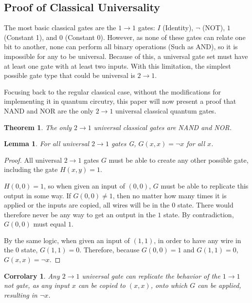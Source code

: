 \documentclass[12pt]{article}
\begin{document}
\subsection{Proof of Classical Universality}
The most basic classical gates are the $1 \to 1$ gates: $I$ (Identity),  $\neg$ (NOT), $1$ (Constant 1), and $0$ (Constant 0). However, as none of these gates can relate one bit to another, none can perform all binary operations (Such as AND), so it is impossible for any to be universal. Because of this, a universal gate set must have at least one gate with at least two inputs.
With this limitation, the simplest possible gate type that could be universal is $2 \to 1$.

Focusing back to the regular classical case, without the modifications for implementing it in quantum circutry, this paper will now present a proof that NAND and NOR are the only $2 \to 1$ universal classical quantum gates.


\newtheorem{theorem}{Theorem}
\newtheorem{lemma}{Lemma}
\newtheorem{corrolary}{Corrolary}

\begin{theorem}
    The only $2 \to 1$ universal classical gates are NAND and NOR.
\end{theorem}

\begin{lemma}
    For all universal $2 \to 1$ gates G, $G(x, x) = \neg x$ for all $x$.
\end{lemma}

\begin{proof}
    All universal $2 \to 1$ gates $G$ must be able to create any other possible gate, including the gate $H(x, y) = 1$.

    $H(0, 0) = 1$, so when given an input of $(0, 0)$, $G$ must be able to replicate this output in some way. If $G(0, 0) \ne 1$, then no matter how many times it is applied or the inputs are copied, all wires will be in the $0$ state. There would therefore never be any way to get an output in the $1$ state. By contradiction, $G(0, 0)$ must equal $1$.
    
    By the same logic, when given an input of $(1, 1)$, in order to have any wire in the $0$ state, $G(1, 1) = 0$.
    Therefore, because $G(0, 0) = 1$ and $G(1, 1) = 0$, $G(x, x) = \neg x$. 
\end{proof}

\begin{corrolary}
    Any $2 \to 1$ universal gate can replicate the behavior of the $1 \to 1$ not gate, as any input $x$ can be copied to $(x, x)$, onto which $G$ can be applied, resulting in $\neg x$.
\end{corrolary}
\end{document}
